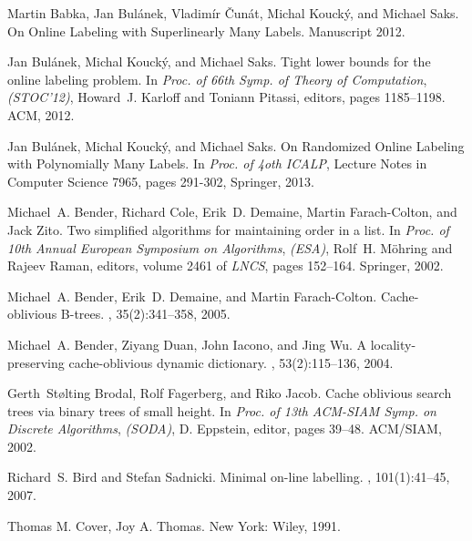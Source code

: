 \documentclass[11pt]{article}
\begin{document}
\newcommand{\etalchar}[1]{$^{#1}$}
\begin{thebibliography}{32}

{Martin Babka, Jan Bul\'{a}nek, Vladim\'{i}r \v{C}un\'{a}t, Michal Kouck\'{y}, and Michael Saks}.
\newblock On Online Labeling with Superlinearly Many Labels.
\newblock Manuscript 2012.

Jan Bul{\'a}nek, Michal Kouck{\'y}, and Michael Saks.
\newblock Tight lower bounds for the online labeling problem.
\newblock In  \emph{Proc. of 66th Symp. of Theory of Computation}, {\em (STOC'12)}, Howard~J. Karloff and Toniann Pitassi, editors, pages 1185--1198. ACM, 2012.

Jan Bul{\'a}nek, Michal Kouck{\'y}, and Michael Saks.
\newblock  On Randomized Online Labeling with Polynomially Many Labels.
\newblock In \emph{Proc. of 4oth  ICALP}, Lecture Notes in Computer Science 7965,
pages 291-302, Springer, 2013.


Michael~A. Bender, Richard Cole, Erik~D. Demaine, Martin Farach-Colton, and Jack Zito.
\newblock Two simplified algorithms for maintaining order in a list.
\newblock In \emph{Proc. of 10th Annual European Symposium on Algorithms}, {\em (ESA)}, Rolf~H. M{\"o}hring and Rajeev Raman, editors, volume 2461 of {\em LNCS}, pages 152--164. Springer, 2002.

Michael~A. Bender, Erik~D. Demaine, and Martin Farach-Colton.
\newblock Cache-oblivious {B}-trees.
, 35(2):341--358, 2005.

Michael~A. Bender, Ziyang Duan, John Iacono, and Jing Wu.
\newblock A locality-preserving cache-oblivious dynamic dictionary.
, 53(2):115--136, 2004.

Gerth~St{\o}lting Brodal, Rolf Fagerberg, and Riko Jacob.
\newblock Cache oblivious search trees via binary trees of small height.
\newblock In \emph{Proc. of 13th ACM-SIAM Symp. on Discrete Algorithms}, {\em (SODA)}, D. Eppstein, editor, pages 39--48. ACM/SIAM, 2002.

Richard~S. Bird and Stefan Sadnicki.
\newblock Minimal on-line labelling.
, 101(1):41--45, 2007.

Thomas M. Cover, Joy A. Thomas. 
\newblock  New York: Wiley, 1991.


\end{thebibliography}
\end{document}
